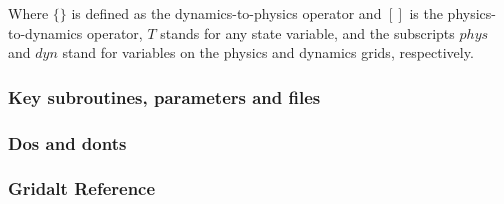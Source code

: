 Where $\{\}$ is defined as the dynamics-to-physics operator and $[ ]$ is the physics-to-dynamics operator, $T$ stands for any state variable, and the subscripts $phys$ and $dyn$ stand for variables on
the physics and dynamics grids, respectively.

\subsubsection {Key subroutines, parameters and files } 

\subsubsection {Dos and donts}

\subsubsection {Gridalt Reference} 
